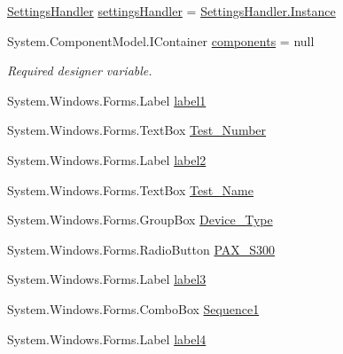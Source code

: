 \begin{DoxyCompactItemize}
\item 
\mbox{\hyperlink{class_cert_complete_1_1_settings_handler}{Settings\+Handler}} \mbox{\hyperlink{class_cert_complete_1_1_test___creation___form_ad9533f8b1f2ef02e57708c9dc44dc079}{settings\+Handler}} = \mbox{\hyperlink{class_cert_complete_1_1_settings_handler_a7c4f8eb33b1113986d52942f93e52da8}{Settings\+Handler.\+Instance}}
\item 
System.\+Component\+Model.\+I\+Container \mbox{\hyperlink{class_cert_complete_1_1_test___creation___form_a15bbef7e09c80a39a6620c75aaf8301c}{components}} = null
\begin{DoxyCompactList}\small\item\em Required designer variable. \end{DoxyCompactList}\item 
System.\+Windows.\+Forms.\+Label \mbox{\hyperlink{class_cert_complete_1_1_test___creation___form_a82c60a9ee8f3f95d1d5102e35edc1ea3}{label1}}
\item 
System.\+Windows.\+Forms.\+Text\+Box \mbox{\hyperlink{class_cert_complete_1_1_test___creation___form_a220abb84bf4e74e4621c513880b269a5}{Test\+\_\+\+Number}}
\item 
System.\+Windows.\+Forms.\+Label \mbox{\hyperlink{class_cert_complete_1_1_test___creation___form_a4c7570e2b21941886eef33f863c78ee4}{label2}}
\item 
System.\+Windows.\+Forms.\+Text\+Box \mbox{\hyperlink{class_cert_complete_1_1_test___creation___form_a0df45d94ee627ee0989fed5729759585}{Test\+\_\+\+Name}}
\item 
System.\+Windows.\+Forms.\+Group\+Box \mbox{\hyperlink{class_cert_complete_1_1_test___creation___form_a3cec501730956619ddaadd8923ffd1ed}{Device\+\_\+\+Type}}
\item 
System.\+Windows.\+Forms.\+Radio\+Button \mbox{\hyperlink{class_cert_complete_1_1_test___creation___form_a2f3c3a658ba916bdddba716002b22419}{P\+A\+X\+\_\+\+S300}}
\item 
System.\+Windows.\+Forms.\+Label \mbox{\hyperlink{class_cert_complete_1_1_test___creation___form_aaf155f61defb9b9fa7b82b330f661d7c}{label3}}
\item 
System.\+Windows.\+Forms.\+Combo\+Box \mbox{\hyperlink{class_cert_complete_1_1_test___creation___form_a275568f14bb0eb971e80ebcd6c343a95}{Sequence1}}
\item 
System.\+Windows.\+Forms.\+Label \mbox{\hyperlink{class_cert_complete_1_1_test___creation___form_a4e35d2bb814164a8f1c708286f014433}{label4}}

\end{DoxyCompactItemize}

